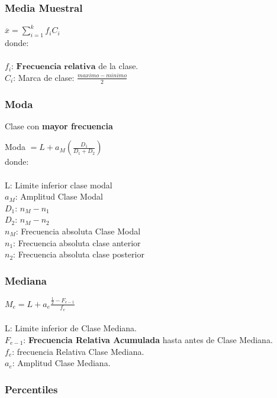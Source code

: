 \subsubsection{Media Muestral}

$\overline{x} = \sum_{i=1}^k f_i C_i$\\
donde:\\ \\
$f_i$: $\textbf{Frecuencia relativa}$ de la clase.\\
$C_i$: Marca de clase: $\frac{maximo - minimo}{2}$

\subsubsection{Moda}
Clase con \textbf{mayor frecuencia}

Moda $= L + a_M(\frac{D_1}{D_1 + D_2})$\\
donde:\\ \\
L: Limite inferior clase modal\\
$a_M$: Amplitud Clase Modal\\
$D_1$: $n_M-n_1$\\
$D_2$: $n_M-n_2$\\
$n_M$: Frecuencia absoluta Clase Modal\\
$n_1$: Frecuencia absoluta clase anterior\\
$n_2$: Frecuencia absoluta clase posterior\\

\subsubsection{Mediana}

$M_e = L + a_e \frac{\frac{1}{2}-F_{e-1}}{f_e}$\\ \\

L: Limite inferior de Clase Mediana.\\
$F_{e-1}$: \textbf{Frecuencia Relativa Acumulada} hasta antes de Clase Mediana.\\
$f_e$: frecuencia Relativa Clase Mediana.\\
$a_e$: Amplitud Clase Mediana.\\

\subsubsection{Percentiles}

